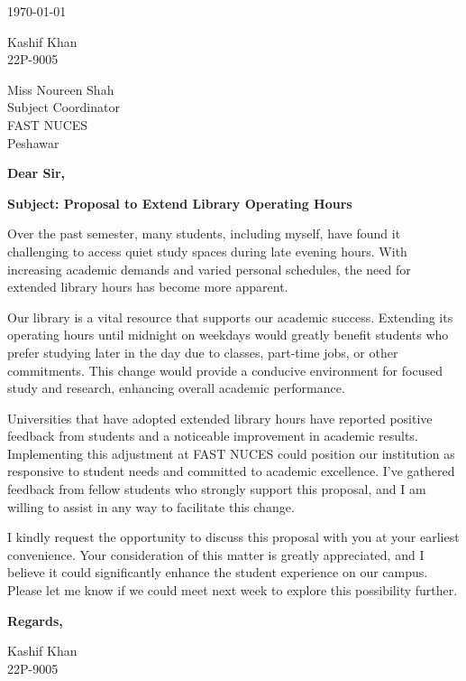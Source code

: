 \documentclass{letter}
\begin{document}
\begin{flushleft}
\today
\end{flushleft}

\vspace{1em}

Kashif Khan \\
22P-9005

\vspace{2em}

Miss Noureen Shah \\
Subject Coordinator  \\
FAST NUCES \\
Peshawar

\vspace{2em}

\textbf{Dear Sir,}

\vspace{1em}

\noindent
\textbf{Subject: Proposal to Extend Library Operating Hours}

\vspace{1em}

Over the past semester, many students, including myself, have found it challenging to access quiet study spaces during late evening hours. With increasing academic demands and varied personal schedules, the need for extended library hours has become more apparent.

\vspace{1em}

Our library is a vital resource that supports our academic success. Extending its operating hours until midnight on weekdays would greatly benefit students who prefer studying later in the day due to classes, part-time jobs, or other commitments. This change would provide a conducive environment for focused study and research, enhancing overall academic performance.

\vspace{1em}

Universities that have adopted extended library hours have reported positive feedback from students and a noticeable improvement in academic results. Implementing this adjustment at FAST NUCES could position our institution as responsive to student needs and committed to academic excellence. I've gathered feedback from fellow students who strongly support this proposal, and I am willing to assist in any way to facilitate this change.

\vspace{1em}

I kindly request the opportunity to discuss this proposal with you at your earliest convenience. Your consideration of this matter is greatly appreciated, and I believe it could significantly enhance the student experience on our campus. Please let me know if we could meet next week to explore this possibility further.

\vspace{2em}

\textbf{Regards,}

\vspace{1em}

Kashif Khan \\
22P-9005
\end{document}
